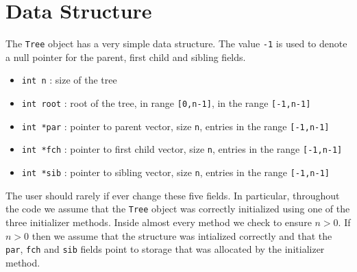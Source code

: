\par
\section{Data Structure}
\label{section:Tree:dataStructure}
\par
The {\tt Tree} object has a very simple data structure.
The value {\tt -1} is used to denote a null pointer
for the parent, first child and sibling fields.
\begin{itemize}
\item
{\tt int n}    : size of the tree 
\item
{\tt int root} : root of the tree, in range {\tt [0,n-1]},
in the range {\tt [-1,n-1]} 
\item
{\tt int *par}  : pointer to parent vector, size {\tt n},
entries in the range {\tt [-1,n-1]} 
\item
{\tt int *fch}  : pointer to first child vector, size {\tt n},
entries in the range {\tt [-1,n-1]} 
\item
{\tt int *sib}  : pointer to sibling vector, size {\tt n},
entries in the range {\tt [-1,n-1]} 
\end{itemize}
The user should rarely if ever change these five fields.
In particular, throughout the code we assume that the {\tt Tree}
object was correctly initialized using one of the three initializer
methods.
Inside almost every method we check to ensure $n > 0$.
If $n > 0$ then we assume that the structure was intialized
correctly and that the {\tt par}, {\tt fch} and {\tt sib} fields
point to storage that was allocated by the initializer method.
